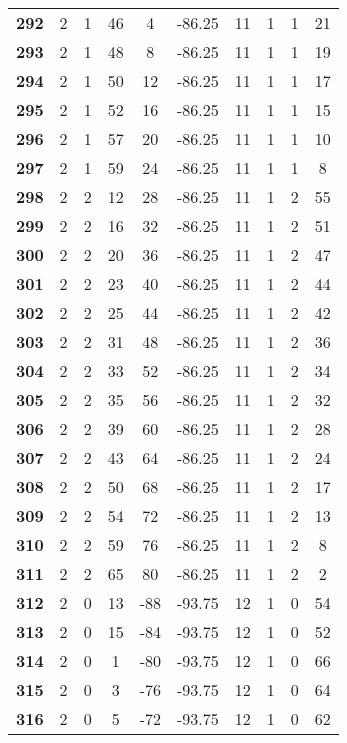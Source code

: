 \documentclass[12pt,letterpaper, onecolumn]{exam}
\begin{document}
\begin{longtable}{cccccccccc}
    \textbf{292} & 2 & 1 & 46 & 4 & -86.25 & 11 & 1 & 1 & 21 \\ 
    \textbf{293} & 2 & 1 & 48 & 8 & -86.25 & 11 & 1 & 1 & 19 \\ 
    \textbf{294} & 2 & 1 & 50 & 12 & -86.25 & 11 & 1 & 1 & 17 \\ 
    \textbf{295} & 2 & 1 & 52 & 16 & -86.25 & 11 & 1 & 1 & 15 \\ 
    \textbf{296} & 2 & 1 & 57 & 20 & -86.25 & 11 & 1 & 1 & 10 \\ 
    \textbf{297} & 2 & 1 & 59 & 24 & -86.25 & 11 & 1 & 1 & 8 \\ 
    \textbf{298} & 2 & 2 & 12 & 28 & -86.25 & 11 & 1 & 2 & 55 \\ 
    \textbf{299} & 2 & 2 & 16 & 32 & -86.25 & 11 & 1 & 2 & 51 \\ 
    \textbf{300} & 2 & 2 & 20 & 36 & -86.25 & 11 & 1 & 2 & 47 \\ 
    \textbf{301} & 2 & 2 & 23 & 40 & -86.25 & 11 & 1 & 2 & 44 \\ 
    \textbf{302} & 2 & 2 & 25 & 44 & -86.25 & 11 & 1 & 2 & 42 \\ 
    \textbf{303} & 2 & 2 & 31 & 48 & -86.25 & 11 & 1 & 2 & 36 \\ 
    \textbf{304} & 2 & 2 & 33 & 52 & -86.25 & 11 & 1 & 2 & 34 \\ 
    \textbf{305} & 2 & 2 & 35 & 56 & -86.25 & 11 & 1 & 2 & 32 \\ 
    \textbf{306} & 2 & 2 & 39 & 60 & -86.25 & 11 & 1 & 2 & 28 \\ 
    \textbf{307} & 2 & 2 & 43 & 64 & -86.25 & 11 & 1 & 2 & 24 \\ 
    \textbf{308} & 2 & 2 & 50 & 68 & -86.25 & 11 & 1 & 2 & 17 \\ 
    \textbf{309} & 2 & 2 & 54 & 72 & -86.25 & 11 & 1 & 2 & 13 \\ 
    \textbf{310} & 2 & 2 & 59 & 76 & -86.25 & 11 & 1 & 2 & 8 \\ 
    \textbf{311} & 2 & 2 & 65 & 80 & -86.25 & 11 & 1 & 2 & 2 \\ 
    \textbf{312} & 2 & 0 & 13 & -88 & -93.75 & 12 & 1 & 0 & 54 \\ 
    \textbf{313} & 2 & 0 & 15 & -84 & -93.75 & 12 & 1 & 0 & 52 \\ 
    \textbf{314} & 2 & 0 & 1 & -80 & -93.75 & 12 & 1 & 0 & 66 \\ 
    \textbf{315} & 2 & 0 & 3 & -76 & -93.75 & 12 & 1 & 0 & 64 \\ 
    \textbf{316} & 2 & 0 & 5 & -72 & -93.75 & 12 & 1 & 0 & 62 \\ 

\end{longtable}
\end{document}
